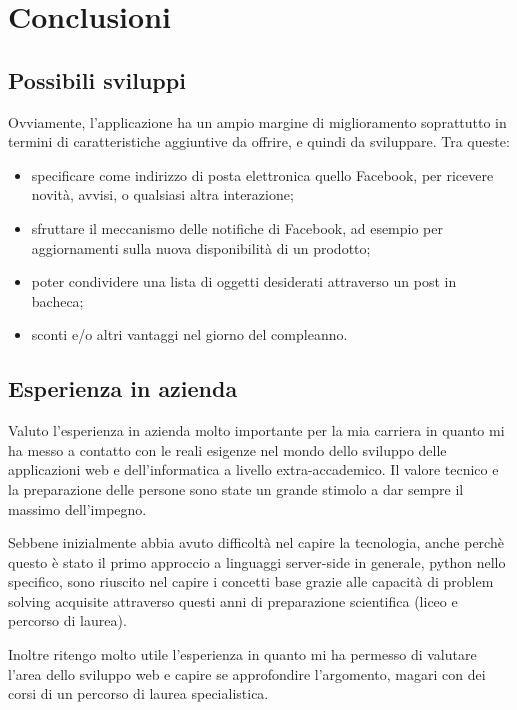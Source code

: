 \chapter{Conclusioni}
\section{Possibili sviluppi}
Ovviamente, l'applicazione ha un ampio margine di miglioramento soprattutto in termini di caratteristiche aggiuntive da offrire, e quindi da sviluppare.
Tra queste:
 \begin{itemize}
	\item specificare come indirizzo di posta elettronica quello Facebook, per ricevere novità, avvisi, o qualsiasi altra interazione;
	\item sfruttare il meccanismo delle notifiche di Facebook, ad esempio per aggiornamenti sulla nuova disponibilità di un prodotto;
	\item poter condividere una lista di oggetti desiderati attraverso un post in bacheca;
	\item sconti e/o altri vantaggi nel giorno del compleanno.
\end{itemize}

\section{Esperienza in azienda}
Valuto l'esperienza in azienda molto importante per la mia carriera in quanto mi ha messo a contatto con le reali esigenze nel mondo dello sviluppo delle applicazioni web e dell'informatica a livello extra-accademico. Il valore tecnico e la preparazione delle persone sono state un grande stimolo a dar sempre il massimo dell'impegno.

Sebbene inizialmente abbia avuto difficoltà nel capire la tecnologia, anche perchè questo è stato il primo approccio a linguaggi server-side in generale, python nello specifico, sono riuscito nel capire i concetti base grazie alle capacità di problem solving acquisite attraverso questi anni di preparazione scientifica (liceo e percorso di laurea). 

Inoltre ritengo molto utile l'esperienza in quanto mi ha permesso di valutare l'area dello sviluppo web e capire se approfondire l'argomento, magari con dei corsi di un percorso di laurea specialistica.
